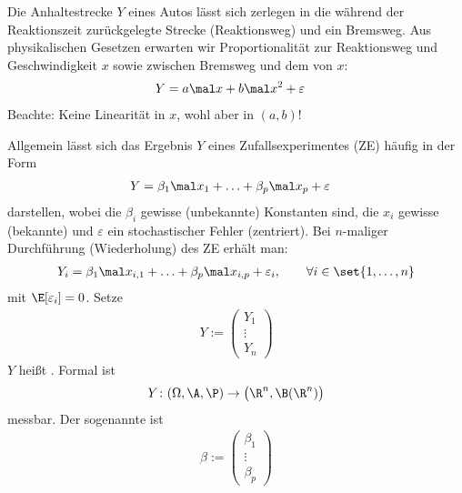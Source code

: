 \begin{beispiel}\label{beispiel:1.3}
	Die Anhaltestrecke $Y$ eines Autos lässt sich zerlegen in die während der Reaktionszeit zurückgelegte Strecke (Reaktionsweg) und ein Bremsweg.
	Aus physikalischen Gesetzen erwarten wir Proportionalität zur Reaktionsweg und Geschwindigkeit $x$ sowie zwischen Bremsweg und dem  von $x$:
	\begin{align*}
		Y&=a\mal x+b\mal x^2+\varepsilon
	\end{align*}
	Beachte: Keine Linearität in $x$, wohl aber in $(a,b)$!
\end{beispiel}

Allgemein lässt sich das Ergebnis $Y$ eines Zufallsexperimentes (ZE) häufig in der Form
\begin{align*}
	Y&=\beta_1\mal x_1+\ldots+\beta_p\mal x_p+\varepsilon
\end{align*}
darstellen, wobei die $\beta_i$ gewisse (unbekannte) Konstanten sind, die $x_i$ gewisse (bekannte) 
und $\varepsilon$ ein stochastischer Fehler (zentriert).
Bei $n$-maliger Durchführung (Wiederholung) des ZE erhält man:
\begin{align}\label{eq:1.1}
	Y_i=\beta_1\mal x_{i,1}+\ldots+\beta_p\mal x_{i,p}+\varepsilon_i,\qquad\forall i\in\set{1,\ldots,n}
\end{align}
mit $\E[\varepsilon_i]=0$.
Setze
\begin{align*}
	Y:=
	\begin{pmatrix}
		Y_1\\
		\vdots\\
		Y_n
	\end{pmatrix}
\end{align*}
$Y$ heißt .
Formal ist
\begin{align*}
	Y\colon(\Omega,\A,\P)\to\big(\R^n,\B(\R^n)\big)
\end{align*}
messbar.
Der sogenannte  ist
\begin{align*}
	\beta:=\begin{pmatrix}
		\beta_1\\
		\vdots\\
		\beta_p
	\end{pmatrix}
\end{align*}
